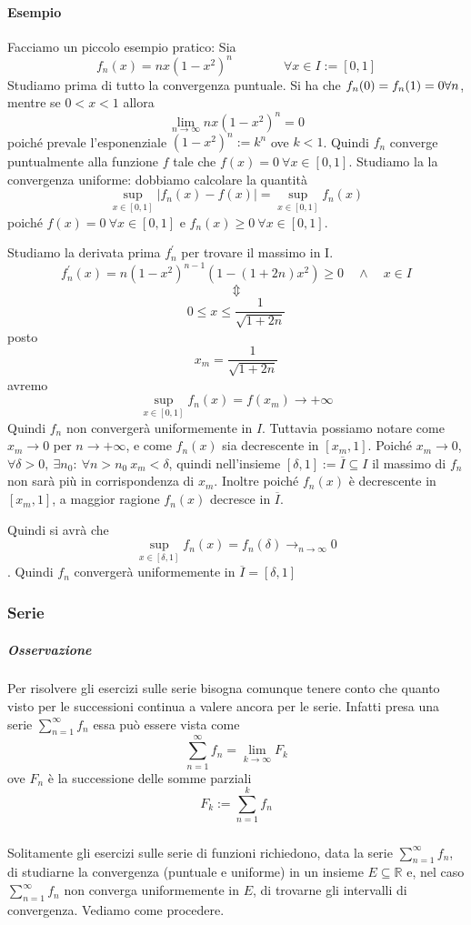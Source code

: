 \documentclass[a4paper,12pt]{article}
\begin{document}
\paragraph*{Esempio}
Facciamo un piccolo esempio pratico:
Sia $$f_n(x)= nx(1-x^2)^n \qquad \qquad \forall x\in I:=[0,1]$$
Studiamo prima di tutto la convergenza puntuale.
Si ha che $f_n(0)=f_n(1)=0 \\ \forall n$, mentre se $0<x<1$ allora 
$$\lim_{n\to\infty}nx(1-x^2)^n=0$$
poiché prevale l'esponenziale $(1-x^2)^n:=k^n$ ove $k<1$.
Quindi $f_n $ converge puntualmente alla funzione $f$ tale che $f(x)=0 \ \forall x \in[0,1]$.
Studiamo la la convergenza uniforme: dobbiamo calcolare la quantità
$$\sup_{x\in[0,1]}|f_n(x)-f(x)|=\sup_{x\in[0,1]}f_n(x)$$ 
poiché $f(x)=0 \ \forall x \in [0,1]$ e $f_n(x)\geq0 \ \forall x \in [0,1]$.


Studiamo la derivata prima $f^{'}_n$ per trovare il massimo in I.
\begin{displaymath}
f^{'}_n(x)=n(1-x^2)^{n-1}(1-(1+2n)x^2)\geq 0 \quad \wedge \quad x\in I
\end{displaymath}
$$ \Updownarrow$$
$$0\leq x\leq \frac{1}{\sqrt{1+2n}}$$
posto $$x_m=\frac{1}{\sqrt{1+2n}}$$ avremo
$$\sup_{x\in[0,1]}f_n(x)=f(x_m)\to + \infty$$
Quindi $f_n$ non convergerà uniformemente in $I$.
Tuttavia possiamo notare come $x_m\to 0$ per $n\to + \infty$, e come $f_n(x)$ sia decrescente in $[x_m,1]$.
Poiché $x_m\to 0$, $\forall \delta>0, \ \exists n_0: \ \forall n>n_0 \ x_m<\delta$, quindi nell'insieme $[\delta,1]:=\overline{I}\subseteq I$ il massimo di $f_n$ non sarà più in corrispondenza di $x_m$. Inoltre poiché $f_n(x)$ è decrescente in $[x_m,1]$, a maggior ragione $f_n(x)$ decresce in $\overline{I}$.

Quindi si avrà che 
$$\sup_{x\in[\delta,1]}f_n(x)=f_n(\delta)\rightarrow_{n\to\infty} 0  $$.
Quindi $f_n$ convergerà uniformemente in $\overline{I}=[\delta,1]$
 
\subsubsection{Serie}
\subparagraph*{Osservazione}
Per risolvere gli esercizi sulle serie bisogna comunque tenere conto che quanto visto per le successioni continua a valere ancora per le serie. Infatti presa una serie $\sum_{n=1}^{\infty}f_n$ essa può essere vista come 
$$\sum_{n=1}^{\infty}f_n=\lim_{k\to\infty}F_k$$
ove $F_n$ è la successione delle somme parziali
$$F_k:=\sum_{n=1}^{k}f_n$$
\subparagraph*{}
Solitamente gli esercizi sulle serie di funzioni richiedono, data la serie $\sum_{n=1}^{\infty}f_n$, di studiarne la convergenza (puntuale e uniforme) in un insieme $E\subseteq \mathbb{R}$ e, nel caso $\sum_{n=1}^{\infty}f_n$ non converga uniformemente in $E$, di trovarne gli intervalli di convergenza. Vediamo come procedere.
\end{document}
